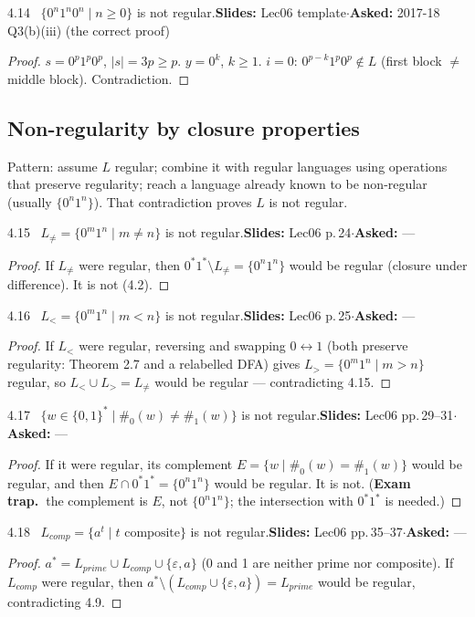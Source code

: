 \documentclass[10.5pt,a4paper]{article}
\newcommand{\TRAP}{\textbf{\color{trapborder}Exam trap.\ }}
\newcommand{\src}[2]{{\footnotesize\color{gray!70!black}\textbf{Slides:} #1\enspace$\cdot$\enspace\textbf{Asked:} #2}\par}
\newcommand{\eps}{\varepsilon}
\begin{document}
\begin{thm}{4.14 \ $\{0^n1^n0^n\mid n\ge0\}$ is not regular.}\src{Lec06 template}{2017-18 Q3(b)(iii) (the correct proof)}\end{thm}
\begin{proof}
$s=0^p1^p0^p$, $|s|=3p\ge p$. $y=0^k$, $k\ge1$. $i=0$: $0^{p-k}1^p0^p\notin L$ (first block $\ne$ middle block). Contradiction.
\end{proof}

\subsection{Non-regularity by closure properties}
Pattern: assume $L$ regular; combine it with regular languages using operations that preserve regularity; reach a language already known
to be non-regular (usually $\{0^n1^n\}$). That contradiction proves $L$ is not regular.

\begin{thm}{4.15 \ $L_{\ne}=\{0^m1^n\mid m\ne n\}$ is not regular.}\src{Lec06 p.\,24}{---}\end{thm}
\begin{proof}
If $L_{\ne}$ were regular, then $0^*1^*\setminus L_{\ne}=\{0^n1^n\}$ would be regular (closure under difference). It is not (4.2).
\end{proof}

\begin{thm}{4.16 \ $L_<=\{0^m1^n\mid m<n\}$ is not regular.}\src{Lec06 p.\,25}{---}\end{thm}
\begin{proof}
If $L_<$ were regular, reversing and swapping $0\leftrightarrow1$ (both preserve regularity: Theorem 2.7 and a relabelled DFA) gives
$L_>=\{0^m1^n\mid m>n\}$ regular, so $L_<\cup L_>=L_{\ne}$ would be regular --- contradicting 4.15.
\end{proof}

\begin{thm}{4.17 \ $\{w\in\{0,1\}^*\mid \#_0(w)\ne\#_1(w)\}$ is not regular.}\src{Lec06 pp.\,29--31}{---}\end{thm}
\begin{proof}
If it were regular, its complement $E=\{w\mid\#_0(w)=\#_1(w)\}$ would be regular, and then $E\cap0^*1^*=\{0^n1^n\}$ would be regular. It is
not. (\TRAP the complement is $E$, not $\{0^n1^n\}$; the intersection with $0^*1^*$ is needed.)
\end{proof}

\begin{thm}{4.18 \ $L_{comp}=\{a^t\mid t \text{ composite}\}$ is not regular.}\src{Lec06 pp.\,35--37}{---}\end{thm}
\begin{proof}
$a^*=L_{prime}\cup L_{comp}\cup\{\eps,a\}$ (0 and 1 are neither prime nor composite). If $L_{comp}$ were regular, then
$a^*\setminus(L_{comp}\cup\{\eps,a\})=L_{prime}$ would be regular, contradicting 4.9.
\end{proof}
\end{document}
